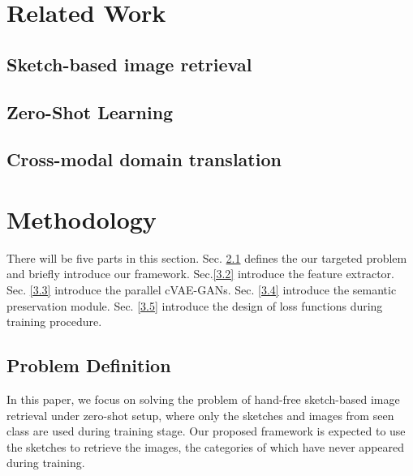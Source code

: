 \documentclass[10pt,twocolumn,letterpaper]{article}
\begin{document}

\section{Related Work}

\subsection{Sketch-based image retrieval}

\subsection{Zero-Shot Learning}

\subsection{Cross-modal domain translation}

\section{Methodology}
There will be five parts in this section. Sec. \ref{3.1} defines the our targeted problem and briefly introduce our framework. Sec.\ref{3.2} introduce the feature extractor. Sec. \ref{3.3} introduce the parallel cVAE-GANs. Sec. \ref{3.4} introduce the semantic preservation module. Sec. \ref{3.5} introduce the design of loss functions during training procedure.

\subsection{Problem Definition} \label{3.1}
In this paper, we focus on solving the problem of hand-free sketch-based image retrieval under zero-shot setup, where only the sketches and images from seen class are used during training stage. Our proposed framework is expected to use the sketches to retrieve the images, the categories of which have never appeared during training.
\end{document}
